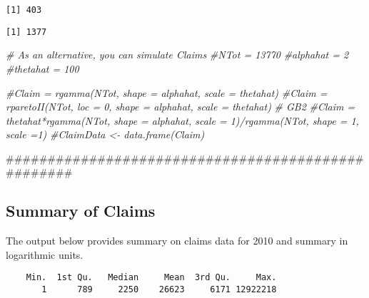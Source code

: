 \documentclass[]{book}
\newenvironment{Shaded}{\begin{snugshade}}{\end{snugshade}}
\newcommand{\KeywordTok}[1]{\textcolor[rgb]{0.13,0.29,0.53}{\textbf{#1}}}
\newcommand{\StringTok}[1]{\textcolor[rgb]{0.31,0.60,0.02}{#1}}
\newcommand{\CommentTok}[1]{\textcolor[rgb]{0.56,0.35,0.01}{\textit{#1}}}
\newcommand{\OperatorTok}[1]{\textcolor[rgb]{0.81,0.36,0.00}{\textbf{#1}}}
\newcommand{\NormalTok}[1]{#1}
\theoremstyle{definition}
\theoremstyle{definition}
\theoremstyle{definition}
\theoremstyle{remark}
\begin{document}
\begin{verbatim}
[1] 403
\end{verbatim}

\begin{Shaded}
\end{Shaded}

\begin{verbatim}
[1] 1377
\end{verbatim}

\begin{Shaded}
\begin{Highlighting}[]
\CommentTok{# As an alternative, you can simulate Claims}
\CommentTok{#NTot = 13770}
\CommentTok{#alphahat = 2}
\CommentTok{#thetahat =  100}

\CommentTok{#Claim = rgamma(NTot, shape = alphahat, scale = thetahat)}
\CommentTok{#Claim = rparetoII(NTot, loc = 0,  shape = alphahat, scale = thetahat)}
\CommentTok{# GB2}
\CommentTok{#Claim = thetahat*rgamma(NTot, shape = alphahat, scale = 1)/rgamma(NTot, shape = 1, scale =1) }
\CommentTok{#ClaimData <- data.frame(Claim)}

\NormalTok{###################################################}
\end{Highlighting}
\end{Shaded}

\subsection{Summary of Claims}\label{summary-of-claims}

The output below provides summary on claims data for 2010 and summary in
logarithmic units.

\begin{Shaded}
\end{Shaded}

\begin{verbatim}
    Min.  1st Qu.   Median     Mean  3rd Qu.     Max. 
       1      789     2250    26623     6171 12922218 
\end{verbatim}
\end{document}
